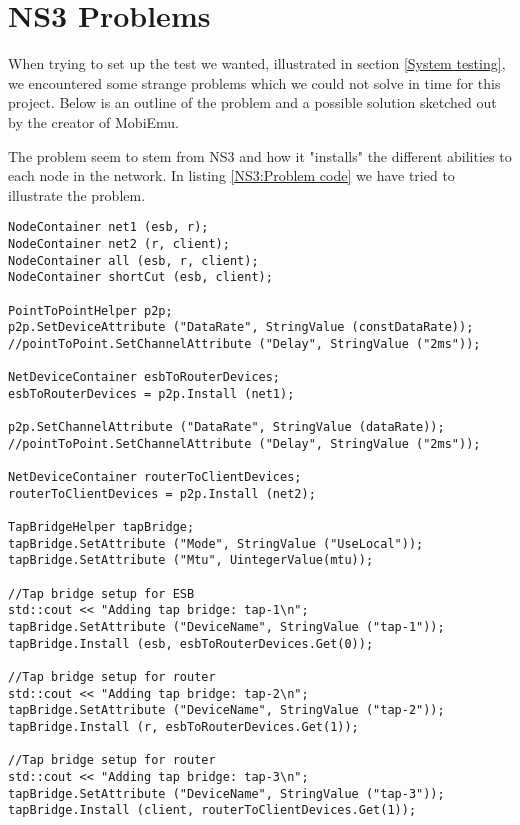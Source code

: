 \section{NS3 Problems}\label{NS3 Problems}
	When trying to set up the test we wanted, illustrated in section \ref{System testing}, we encountered some strange problems which we could not solve in time for this project. Below is an outline of the problem and a possible solution sketched out by the creator of MobiEmu.
	
	The problem seem to stem from NS3 and how it "installs" the different abilities to each node in the network. In listing \ref{NS3:Problem code} we have tried to illustrate the problem.
	
\lstset{language=C++, style=eclipse}
\begin{lstlisting}[frame=single, caption={This code snippet does not work}, label=NS3:Problem code, breaklines=true]
NodeContainer net1 (esb, r);
NodeContainer net2 (r, client);
NodeContainer all (esb, r, client);
NodeContainer shortCut (esb, client);

PointToPointHelper p2p;
p2p.SetDeviceAttribute ("DataRate", StringValue (constDataRate));
//pointToPoint.SetChannelAttribute ("Delay", StringValue ("2ms"));

NetDeviceContainer esbToRouterDevices;
esbToRouterDevices = p2p.Install (net1);

p2p.SetChannelAttribute ("DataRate", StringValue (dataRate));
//pointToPoint.SetChannelAttribute ("Delay", StringValue ("2ms"));

NetDeviceContainer routerToClientDevices;
routerToClientDevices = p2p.Install (net2);

TapBridgeHelper tapBridge;
tapBridge.SetAttribute ("Mode", StringValue ("UseLocal"));
tapBridge.SetAttribute ("Mtu", UintegerValue(mtu)); 

//Tap bridge setup for ESB
std::cout << "Adding tap bridge: tap-1\n";
tapBridge.SetAttribute ("DeviceName", StringValue ("tap-1"));
tapBridge.Install (esb, esbToRouterDevices.Get(0));

//Tap bridge setup for router
std::cout << "Adding tap bridge: tap-2\n";
tapBridge.SetAttribute ("DeviceName", StringValue ("tap-2"));
tapBridge.Install (r, esbToRouterDevices.Get(1));

//Tap bridge setup for router
std::cout << "Adding tap bridge: tap-3\n";
tapBridge.SetAttribute ("DeviceName", StringValue ("tap-3"));
tapBridge.Install (client, routerToClientDevices.Get(1));
\end{lstlisting}
	
